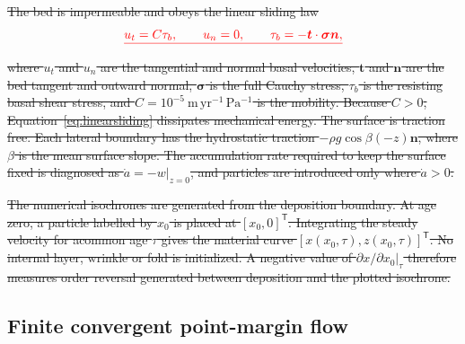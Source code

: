 \documentclass[review]{igs}
\providecommand{\DIFdel}[1]{{\protect\color{red}\sout{#1}}}                      %
\providecommand{\DIFaddbegin}{} %
\providecommand{\DIFaddend}{} %
\providecommand{\DIFdelend}{} %
\newcommand{\DIFaddincludegraphics}[2][]{{\color{blue}\fbox{\DIFOincludegraphics[#1]{#2}}}} %
\DeclareRobustCommand{\DIFaddbegin}{\DIFOaddbegin \let\includegraphics\DIFaddincludegraphics} %
\DeclareRobustCommand{\DIFaddend}{\DIFOaddend \let\includegraphics\DIFOincludegraphics} %
\DeclareRobustCommand{\DIFdelend}{\DIFOaddend \let\includegraphics\DIFOincludegraphics} %
\begin{document}
\DIFdel{The bed is impermeable and obeys the linear sliding law
}\begin{displaymath}
\DIFdel{u_t=C\tau_b,
\qquad
u_n=0,
\qquad
\tau_b=-\bm{t}\mathbin{\cdot}\bm{\sigma}\bm{n},
}\end{displaymath}%
\DIFdel{where \(u_t\) and \(u_n\) are the tangential and normal basal velocities, \(\bm{t}\) and \(\bm{n}\) are the bed tangent and outward normal, \(\bm{\sigma}\) is the full Cauchy stress, \(\tau_b\) is the resisting basal shear stress, and \(C=10^{-5}~\mathrm{m\,yr^{-1}\,Pa^{-1}}\) is the mobility. Because \(C>0\), Equation~\ref{eq:linearsliding} dissipates mechanical energy. The surface is traction free. Each lateral boundary has the hydrostatic traction \(-\rho g\cos\beta(-z)\bm{n}\), where \(\beta\) is the mean surface slope. The accumulation rate required to keep the surface fixed is diagnosed as \(\dot a=-\left.w\right|_{z=0}\), and particles are introduced only where \(\dot a>0\). }%

\DIFdel{The numerical isochrones are generated from the deposition boundary.
At age zero, a particle labelled by \(x_0\) is placed at \([x_0,0]^{\mathsf T}\). Integrating the steady velocity for acommon age \(\tau\) gives the material curve \([x(x_0,\tau),z(x_0,\tau)]^{\mathsf T}\). No internal layer, wrinkle or fold is initialized. A negative value of \(\left.\partial x/\partial x_0\right|_\tau\) therefore measures order reversal generated between deposition and the plotted isochrone. }\DIFdelend \DIFaddbegin \subsection{Finite convergent point-margin flow}
\DIFaddend 
\end{document}
